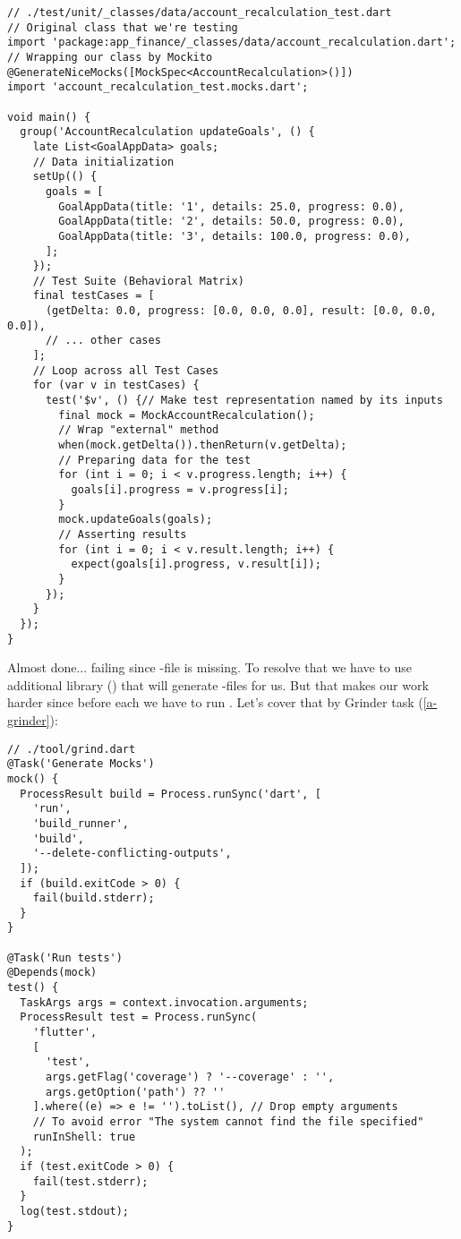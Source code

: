 \begin{lstlisting}
// ./test/unit/_classes/data/account_recalculation_test.dart
// Original class that we're testing
import 'package:app_finance/_classes/data/account_recalculation.dart';
// Wrapping our class by Mockito
@GenerateNiceMocks([MockSpec<AccountRecalculation>()])
import 'account_recalculation_test.mocks.dart';

void main() {
  group('AccountRecalculation updateGoals', () {
    late List<GoalAppData> goals;
    // Data initialization
    setUp(() {
      goals = [
        GoalAppData(title: '1', details: 25.0, progress: 0.0),
        GoalAppData(title: '2', details: 50.0, progress: 0.0),
        GoalAppData(title: '3', details: 100.0, progress: 0.0),
      ];
    });
    // Test Suite (Behavioral Matrix)
    final testCases = [
      (getDelta: 0.0, progress: [0.0, 0.0, 0.0], result: [0.0, 0.0, 0.0]),
      // ... other cases
    ];
    // Loop across all Test Cases
    for (var v in testCases) {
      test('$v', () {// Make test representation named by its inputs
        final mock = MockAccountRecalculation();
        // Wrap "external" method
        when(mock.getDelta()).thenReturn(v.getDelta);
        // Preparing data for the test
        for (int i = 0; i < v.progress.length; i++) {
          goals[i].progress = v.progress[i];
        }
        mock.updateGoals(goals);
        // Asserting results
        for (int i = 0; i < v.result.length; i++) {
          expect(goals[i].progress, v.result[i]);
        }
      });
    }
  });
}
\end{lstlisting}

Almost done... failing since -file is missing. To resolve that we have to use 
additional library  () that will generate -files
for us. But that makes our work harder since before each  we have to run .
Let's cover that by Grinder task (\ref{a-grinder}):

\begin{lstlisting}
// ./tool/grind.dart
@Task('Generate Mocks')
mock() {
  ProcessResult build = Process.runSync('dart', [
    'run',
    'build_runner',
    'build',
    '--delete-conflicting-outputs',
  ]);
  if (build.exitCode > 0) {
    fail(build.stderr);
  }
}

@Task('Run tests')
@Depends(mock)
test() {
  TaskArgs args = context.invocation.arguments;
  ProcessResult test = Process.runSync(
    'flutter', 
    [
      'test',
      args.getFlag('coverage') ? '--coverage' : '',
      args.getOption('path') ?? ''
    ].where((e) => e != '').toList(), // Drop empty arguments
    // To avoid error "The system cannot find the file specified"
    runInShell: true
  );
  if (test.exitCode > 0) {
    fail(test.stderr);
  }
  log(test.stdout);
}
\end{lstlisting}


